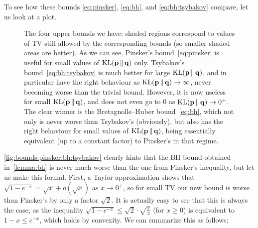 \documentclass[10pt]{article}
\newcommand{\p}{\mathbf{p}}
\newcommand{\q}{\mathbf{q}}
\begin{document}
\noindent To see how these bounds \eqref{eq:pinsker}, \eqref{eq:bh}, and \eqref{eq:bh:tsybakov} compare, let us look at a plot.
\begin{figure}[H]\centering
{} 
\caption{\label{fig:bounds:pinsker:bh:tsybakov}The four upper bounds we have: shaded regions correspond to values of TV still allowed by the corresponding bounds (so smaller shaded areas are better). As we can see, Pinsker's bound~\eqref{eq:pinsker} is useful for small values of $\kldiv{\p}{\q}$ only. Tsybakov's bound~\eqref{eq:bh:tsybakov} is much better for large $\kldiv{\p}{\q}$, and in particular have the right behaviour as $\kldiv{\p}{\q}\to\infty$, never becoming worse than the trivial bound. However, it is now useless for small $\kldiv{\p}{\q}$, and does not even go to $0$ as $\kldiv{\p}{\q}\to 0^+$. The clear winner is the Bretagnolle--Huber bound~\eqref{eq:bh}, which not only is never worse than Tsybakov's (obviously), but also has the right behaviour for small values of $\kldiv{\p}{\q}$, being essentially equivalent (up to a constant factor) to Pinsker's in that regime.}
\end{figure}
\autoref{fig:bounds:pinsker:bh:tsybakov} clearly hints that the BH bound obtained in~\autoref{lemma:bh} is never much worse than the one from Pinsker's inequality, but let us make this formal. First, a Taylor approximation shows that $\sqrt{1-e^{-x}} = \sqrt{x} + o(\sqrt{x})$ as $x\to 0^+$, so for small TV our new bound is worse than Pinsker's by only a factor $\sqrt{2}$. It is actually easy to see that this is always the case, as the inequality $\sqrt{1-e^{-x}} \leq \sqrt{2}\cdot \sqrt{\frac{x}{2}}$ (for $x\geq 0$) is equivalent  to $1-x\leq e^{-x}$, which holds by convexity. We can summarize this as follows:
\end{document}

